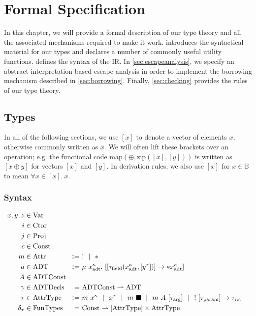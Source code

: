 \chapter{Formal Specification}\label{sec:theory}

In this chapter, we will provide a formal description of our type theory and all the associated mechanisms required to make it work.  introduces the syntactical material for our types and declares a number of commonly useful utility functions.  defines the syntax of the IR. In \cref{sec:escapeanalysis}, we specify an abstract interpretation based escape analysis in order to implement the borrowing mechanism described in \cref{sec:borrowing}. Finally, \cref{sec:checking} provides the rules of our type theory.

\section{Types}\label{sec:types}
In all of the following sections, we use $[x]$ to denote a vector of elements $x$, otherwise commonly written as $\overline{x}$. We will often lift these brackets over an operation; e.g. the functional code $\mathrm{map}(\oplus, \mathrm{zip}([x], [y]))$ is written as $[x \oplus y]$ for vectors $[x]$ and $[y]$. In derivation rules, we also use $[x]$ for $x \in \mathbb{B}$ to mean $\forall x \in [x].\ x$.

\subsection{Syntax}

\newcommand{\dom}{\mathrm{dom}}
\newcommand{\Attr}{\mathrm{Attr}}
\newcommand{\ADT}{\mathrm{ADT}}
\newcommand{\adt}{\mathrm{adt}}
\newcommand{\field}{\mathrm{field}}
\newcommand{\ADTConst}{\mathrm{ADTConst}}
\newcommand{\AttrType}{\mathrm{AttrType}}
\newcommand{\arrg}{\mathrm{arg}}
\newcommand{\param}{\mathrm{param}}
\newcommand{\ret}{\mathrm{ret}}
\newcommand{\ADTDecls}{\mathrm{ADTDecls}}
\newcommand{\FunTypes}{\mathrm{FunTypes}}

\begin{alignat*}{2}
  x, y, z &\in \Var \\
  i &\in \Ctor \\
  j &\in \Proj \\
  c &\in \Const \\
  m &\in \Attr &\Coloneqq&\ ! \sep * \\
  a &\in \ADT &\Coloneqq&\ \mu\ x^\kappa_\adt.\ [[\tau_\field(x^\kappa_\adt, [y^\tau])] \to *x^\kappa_\adt] \\
  A &\in \mathrlap{\ADTConst} \\
  \gamma &\in \ADTDecls &=&\ \ADTConst \rightharpoonup \ADT \\
  \tau &\in \AttrType &\Coloneqq&\ m\ x^\kappa \sep x^\tau \sep m\ \blacksquare \sep m\ A\ [\tau_\arrg] \sep !\ [\tau_\param] \to \tau_\ret \\
  \delta_\tau &\in \FunTypes &=&\ \Const \rightharpoonup [\AttrType] \times \AttrType
\end{alignat*}

